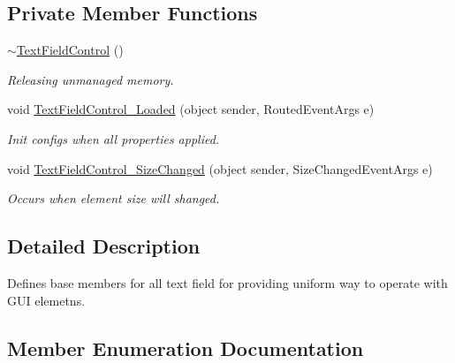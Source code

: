 \subsection*{Private Member Functions}
\begin{DoxyCompactItemize}
\item 
\mbox{\hyperlink{class_wpf_handler_1_1_u_i_1_1_controls_1_1_text_field_control_ab7456e1fe411f936385192629583fb5b}{$\sim$\+Text\+Field\+Control}} ()
\begin{DoxyCompactList}\small\item\em Releasing unmanaged memory. \end{DoxyCompactList}\item 
void \mbox{\hyperlink{class_wpf_handler_1_1_u_i_1_1_controls_1_1_text_field_control_a54beb83e4ba522eea92f86eab02f9071}{Text\+Field\+Control\+\_\+\+Loaded}} (object sender, Routed\+Event\+Args e)
\begin{DoxyCompactList}\small\item\em Init configs when all properties applied. \end{DoxyCompactList}\item 
void \mbox{\hyperlink{class_wpf_handler_1_1_u_i_1_1_controls_1_1_text_field_control_ab07c1f1ee9bd33207b99d5b31bcec8b4}{Text\+Field\+Control\+\_\+\+Size\+Changed}} (object sender, Size\+Changed\+Event\+Args e)
\begin{DoxyCompactList}\small\item\em Occurs when element size will shanged. \end{DoxyCompactList}\end{DoxyCompactItemize}


\subsection{Detailed Description}
Defines base members for all text field for providing uniform way to operate with G\+UI elemetns. 



\subsection{Member Enumeration Documentation}
\mbox{\label{class_wpf_handler_1_1_u_i_1_1_controls_1_1_text_field_control_a99939f3d8500812661376afa5ee1a31d}} 
